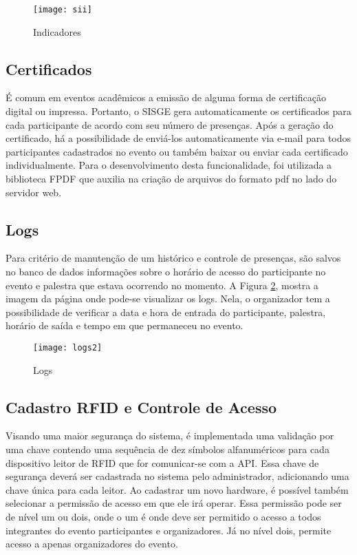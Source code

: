 \documentclass[tcc,capa]{texufpel}
\begin{document}
        \begin{figure}[H]
            \centering \texttt{[image: sii]}
            \caption{Indicadores} 
            \label{charts}
        \end{figure}
        
        \subsection{Certificados}
        
            É comum em eventos acadêmicos a emissão de alguma forma de certificação digital ou impressa. Portanto, o SISGE gera automaticamente os certificados para cada participante de acordo com seu número de presenças.
            Após a geração do certificado, há a possibilidade de enviá-los automaticamente via e-mail para todos participantes cadastrados no evento ou também baixar ou enviar cada certificado individualmente.
            Para o desenvolvimento desta funcionalidade, foi utilizada a biblioteca FPDF \cite{fpdf:2015:Online} que auxilia na criação de arquivos do formato pdf no lado do servidor web.
        
        \subsection{Logs}
        
            Para critério de manutenção de um histórico e controle de presenças, são salvos no banco de dados informações sobre o horário de acesso do participante no evento e palestra que estava ocorrendo no momento. A Figura \ref{logs}, mostra a imagem da página onde pode-se visualizar os logs. Nela, o organizador tem a possibilidade de verificar a data e hora de entrada do participante, palestra, horário de saída e tempo em que permaneceu no evento.
            
            \begin{figure}[H]
                \centering \texttt{[image: logs2]}
                \caption{Logs} 
                \label{logs}
            \end{figure}
    
        \subsection{Cadastro RFID e Controle de Acesso}
        
            Visando uma maior segurança do sistema, é implementada uma validação por uma chave contendo uma sequência de dez símbolos alfanuméricos para cada dispositivo leitor de RFID que for comunicar-se com a API. Essa chave de segurança deverá ser cadastrada no sistema pelo administrador, adicionando uma chave única para cada leitor.
            Ao cadastrar um novo hardware, é possível também selecionar a permissão de acesso em que ele irá operar. Essa permissão pode ser de nível um ou dois, onde o um é onde deve ser permitido o acesso a todos integrantes do evento participantes e organizadores. Já no nível dois, permite acesso a apenas organizadores do evento.
            
\end{document}
